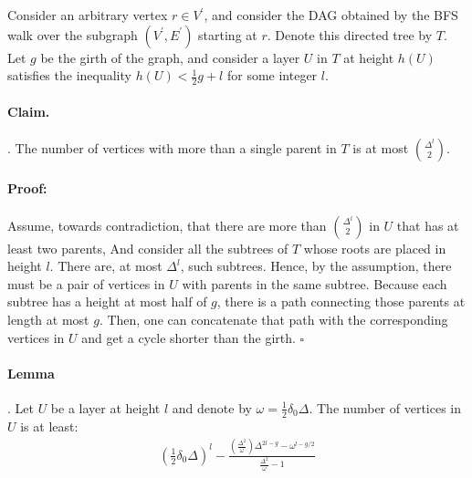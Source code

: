 \documentclass{article}
\begin{document}
\begin{multicols*}{2}
Consider an arbitrary vertex $r \in V^\prime$, and consider the DAG obtained by the BFS walk over the subgraph $\left(V^\prime, E^\prime \right)$ starting at $r$. Denote this directed tree by $T$.
Let $g$ be the girth of the graph, and consider a layer $U$ in $T$ at height $h\left( U \right)$ satisfies the inequality $ h\left( U \right) < \frac{1}{2}g + l$ for some integer $l$.
\paragraph{Claim.}. The number of vertices with more than a single parent in $T$ is at most ${\Delta^l}\choose{2}$.  
\paragraph{Proof:}Assume, towards contradiction, that there are more than $ \Delta^l \choose 2 $ in $U$ that has at least two parents, And consider all the subtrees of $T$ whose roots are placed in height $l$. There are, at most $\Delta^l$, such subtrees. Hence, by the assumption, there must be a pair of vertices in $U$ with parents in the same subtree. Because each subtree has a height at most half of $g$, there is a path connecting those parents at length at most $g$. Then, one can concatenate that path with the corresponding vertices in $U$ and get a cycle shorter than the girth. $\square$

\paragraph{Lemma}. Let $U$ be a layer at height $l$ and denote by $ \omega = \frac{1}{2}\delta_{0}\Delta$. The number of vertices in $U$ is at least: 
\begin{equation*}
  \begin{split}
    \left( \frac{1}{2}\delta_0\Delta \right)^{l}- \frac{\left( \frac{\Delta^{2}}{\omega} \right)\Delta^{2l-g} - \omega^{l-g/2} }{\frac{\Delta^{2}}{\omega}-1}
  \end{split}
\end{equation*}


\end{multicols*}
\end{document}
